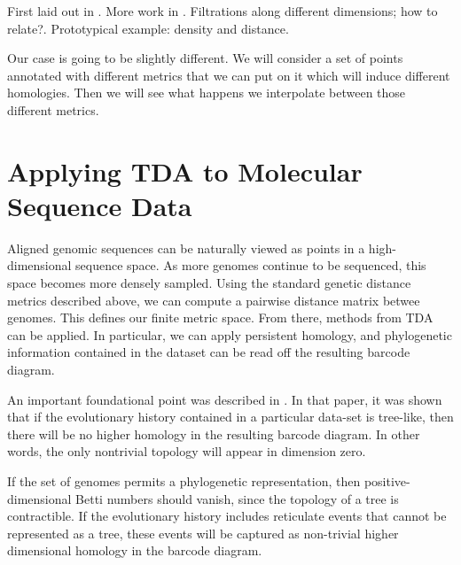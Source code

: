 First laid out in \cite{Carlsson:2009b}.
More work in \cite{Lesnick:2012uv}.
Filtrations along different dimensions; how to relate?.
Prototypical example: density and distance.

Our case is going to be slightly different.
We will consider a set of points annotated with different metrics that we can put on it which will induce different homologies.
Then we will see what happens we interpolate between those different metrics.

\section{Applying TDA to Molecular Sequence Data}

Aligned genomic sequences can be naturally viewed as points in a high-dimensional sequence space.
As more genomes continue to be sequenced, this space becomes more densely sampled.
Using the standard genetic distance metrics described above, we can compute a pairwise distance matrix betwee genomes.
This defines our finite metric space.
From there, methods from TDA can be applied.
In particular, we can apply persistent homology, and phylogenetic information contained in the dataset can be read off the resulting barcode diagram.

An important foundational point was described in \cite{Chan:2013}.
In that paper, it was shown that if the evolutionary history contained in a particular data-set is tree-like, then there will be no higher homology in the resulting barcode diagram.
In other words, the only nontrivial topology will appear in dimension zero.



If the set of genomes permits a phylogenetic representation, then positive-dimensional Betti numbers should vanish, since the topology of a tree is contractible. 
If the evolutionary history includes reticulate events that cannot be represented as a tree, these events will be captured as non-trivial higher dimensional homology in the barcode diagram.


